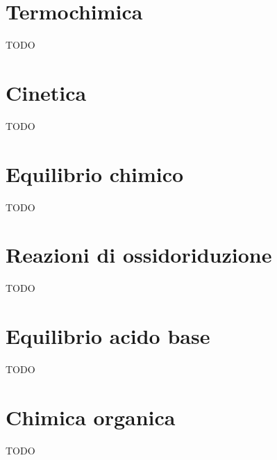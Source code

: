 \documentclass{article}
\begin{document}
    




\pagebreak

\section{Termochimica}
TODO
\pagebreak

\section{Cinetica}
TODO
\pagebreak

\section{Equilibrio chimico}
TODO
\pagebreak

\section{Reazioni di ossidoriduzione}
TODO
\pagebreak

\section{Equilibrio acido base}
TODO
\pagebreak

\section{Chimica organica}
TODO
\end{document}
